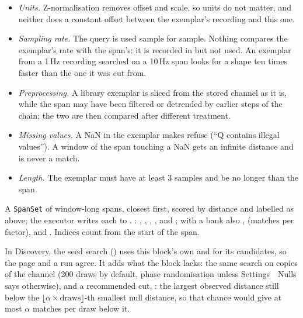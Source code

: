 \begin{itemize}
\item \emph{Units.} Z-normalisation removes offset and scale, so units do not matter, and neither
  does a constant offset between the exemplar's recording and this one.
\item \emph{Sampling rate.} The query is used sample for sample. Nothing compares the exemplar's
  rate with the span's: it is recorded in  but not used. An exemplar
  from a 1\,Hz recording searched on a 10\,Hz span looks for a shape ten times faster than the one
  it was cut from.
\item \emph{Preprocessing.} A library exemplar is sliced from the stored channel as it is, while
  the span may have been filtered or detrended by earlier steps of the chain; the two are then
  compared after different treatment.
\item \emph{Missing values.} A NaN in the exemplar makes  refuse (``Q contains
  illegal values''). A window of the span touching a NaN gets an infinite distance and is never a
  match.
\item \emph{Length.} The exemplar must have at least 3 samples and be no longer than the span.
\end{itemize}

A \texttt{SpanSet} of window-long spans, closest first, scored by distance and labelled as above;
the executor writes each to . : , ,
, ,  and ; with a bank also
,  (matches per factor),  and .
Indices count from the start of the span.

In Discovery, the seed search () uses this block's own
 and  for its candidates, so the page and a run agree.
It adds what the block lacks: the same search on  copies of the channel
(200 draws by default, phase randomisation unless Settings~\textrightarrow~Nulls says otherwise),
and a recommended cut, : the largest observed distance still below the
$\lfloor \alpha \times \text{draws}\rfloor$-th smallest null distance, so that chance would give at
most $\alpha$ matches per draw below it.

